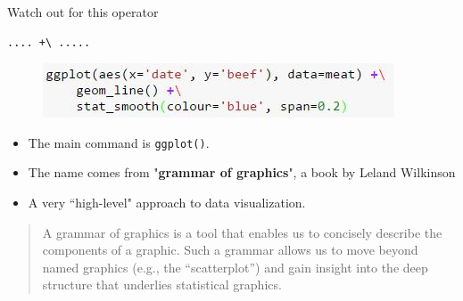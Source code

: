 \documentclass{beamer}
\begin{document}
\begin{frame}[fragile]
	\Large
Watch out for this operator
\begin{framed}
\begin{verbatim}
.... +\ .....
\end{verbatim}
\end{framed}
	\begin{figure}
\centering
\includegraphics[width=1.05\linewidth]{plusoperator}
\end{figure}
\end{frame}
\begin{frame}[fragile]
\Large
\begin{itemize}
\item The main command is \texttt{ggplot()}.
\item The name comes from "\textbf{grammar of graphics}", a book by Leland Wilkinson
\item A very ``high-level" approach to data visualization.
\end{itemize}
\begin{framed}
\begin{quote}
	A grammar of graphics is a tool that enables us to concisely describe the components
	of a graphic. Such a grammar allows us to move beyond named graphics (e.g., the “scatterplot”)
	and gain insight into the deep structure that underlies statistical graphics.
\end{quote}
\end{framed}
\end{frame}
\end{document}
